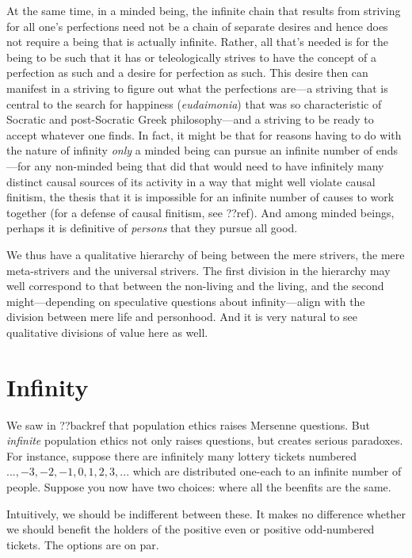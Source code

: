 At the same time, in a minded being, the infinite chain that results from striving for all one's perfections need not be a chain of separate desires
and hence does not require a being that is actually infinite. Rather, all that's needed is for the being to be such that it has or teleologically strives
to have the concept of a perfection as such and a desire for perfection as such. This desire then can manifest in a striving to figure out what the perfections are---a striving that is central to
the search for happiness (\textit{eudaimonia}) that was so characteristic of Socratic and post-Socratic Greek philosophy---and a striving to be ready
to accept whatever one finds. In fact, it might be that for reasons having to do with the nature of infinity \textit{only} a minded being can pursue
an infinite number of ends---for any non-minded being that did that would need to have infinitely many distinct causal sources of its activity in
a way that might well violate causal finitism, the thesis that it is impossible for an infinite number of causes to work together (for a defense
of causal finitism, see ??ref). And among minded beings, perhaps it is definitive of \textit{persons} that they pursue all good.

We thus have a qualitative hierarchy of being between the mere strivers, the mere meta-strivers and the universal strivers. The first division in
the hierarchy may well correspond to that between the non-living and the living, and the second might---depending on speculative questions about
infinity---align with the division between mere life and personhood. And it is very natural to see qualitative divisions of value here as well.

\section{Infinity}
We saw in ??backref that population ethics raises Mersenne questions. But \textit{infinite} population 
ethics not only raises questions, but creates serious paradoxes. For instance, suppose there are infinitely
many lottery tickets numbered $...,-3,-2,-1,0,1,2,3,...$ which are distributed one-each to an infinite number 
of people. Suppose you now have two choices:
where all the beenfits are the same.

Intuitively, we should be indifferent between these. It makes no difference whether we should benefit the 
holders of the positive even or positive odd-numbered tickets. The options are on par. 

